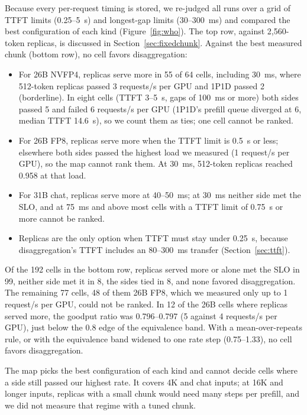 \documentclass[11pt]{article}
\begin{document}
Because every per-request timing is stored, we re-judged all runs over a grid of TTFT limits (0.25--5~s) and longest-gap limits (30--300~ms) and compared the best configuration of each kind (Figure~\ref{fig:who}). The top row, against 2,560-token replicas, is discussed in Section~\ref{sec:fixedchunk}. Against the best measured chunk (bottom row), no cell favors disaggregation:
\begin{itemize}
  \item For 26B NVFP4, replicas serve more in 55 of 64 cells, including 30~ms, where 512-token replicas passed 3 requests/s per GPU and 1P1D passed 2 (borderline). In eight cells (TTFT 3--5~s, gaps of 100~ms or more) both sides passed 5 and failed 6 requests/s per GPU (1P1D's prefill queue diverged at 6, median TTFT 14.6~s), so we count them as ties; one cell cannot be ranked.
  \item For 26B FP8, replicas serve more when the TTFT limit is 0.5~s or less; elsewhere both sides passed the highest load we measured (1 request/s per GPU), so the map cannot rank them. At 30~ms, 512-token replicas reached 0.958 at that load.
  \item For 31B chat, replicas serve more at 40--50~ms; at 30~ms neither side met the SLO, and at 75~ms and above most cells with a TTFT limit of 0.75~s or more cannot be ranked.
  \item Replicas are the only option when TTFT must stay under 0.25~s, because disaggregation's TTFT includes an 80--300~ms transfer (Section~\ref{sec:ttft}).
\end{itemize}
Of the 192 cells in the bottom row, replicas served more or alone met the SLO in 99, neither side met it in 8, the sides tied in 8, and none favored disaggregation. The remaining 77 cells, 48 of them 26B FP8, which we measured only up to 1 request/s per GPU, could not be ranked. In 12 of the 26B cells where replicas served more, the goodput ratio was 0.796--0.797 (5 against 4 requests/s per GPU), just below the 0.8 edge of the equivalence band. With a mean-over-repeats rule, or with the equivalence band widened to one rate step (0.75--1.33), no cell favors disaggregation.

The map picks the best configuration of each kind and cannot decide cells where a side still passed our highest rate. It covers 4K and chat inputs; at 16K and longer inputs, replicas with a small chunk would need many steps per prefill, and we did not measure that regime with a tuned chunk.
\end{document}
